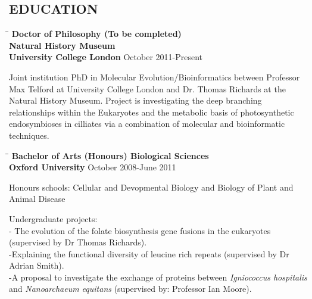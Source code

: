 \documentclass{res}
\begin{document}
\begin{resume}
        
 
\section{EDUCATION}          

\vspace{-0.05in}
\begin{tabbing}
   \hspace{2in}\= \hspace{2.6in}\= \kill 
    {\bf Doctor of Philosophy (To be completed)}\\ 
    {\bf Natural History Museum}\\
    {\bf University College London
    } \>      \>October 2011-Present\\

   \end{tabbing}\vspace{-20pt}  
   
Joint institution PhD in Molecular Evolution/Bioinformatics between Professor Max Telford at University College London and Dr. Thomas Richards at the Natural History Museum.  Project is investigating the deep branching relationships within the Eukaryotes and the metabolic basis of photosynthetic endosymbioses in cilliates via a combination of molecular and bioinformatic techniques. %
 
 
\vspace{-0.1in}
 \begin{tabbing}
   \hspace{2in}\= \hspace{2.6in}\= \kill 
    {\bf Bachelor of Arts (Honours) Biological Sciences}\\
    {\bf Oxford University
    } \>      \>October 2008-June 2011\\
                          

   \end{tabbing}\vspace{-20pt}  
Honours schools: Cellular and Devopmental Biology and Biology of Plant and Animal Disease\

Undergraduate projects: \\
- The evolution of the folate biosynthesis gene fusions in the eukaryotes (supervised by Dr Thomas Richards).
\\-Explaining the functional diversity of leucine rich repeats (supervised by Dr Adrian Smith).
\\-A proposal to investigate the exchange of proteins between  \emph{Igniococcus hospitalis} and  \emph{Nanoarchaeum equitans} (supervised by: Professor Ian Moore).



\end{resume}
\end{document}
